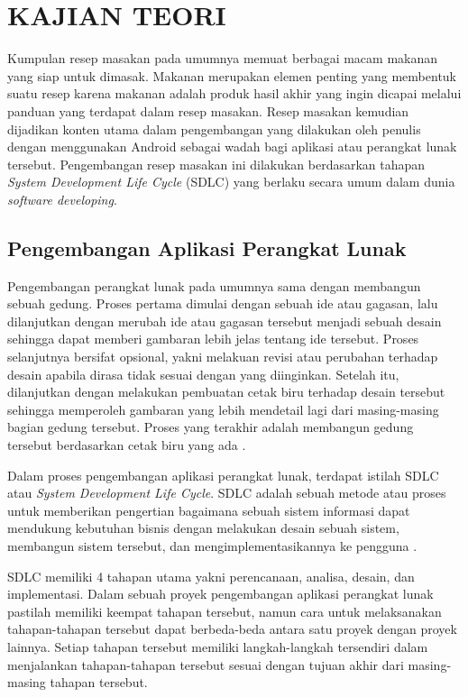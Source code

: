 
\chapter{KAJIAN TEORI}                

Kumpulan resep masakan pada umumnya memuat berbagai macam makanan yang siap untuk dimasak. Makanan merupakan elemen penting yang membentuk suatu resep karena makanan adalah produk hasil akhir yang ingin dicapai melalui panduan yang terdapat dalam resep masakan. Resep masakan kemudian dijadikan konten utama dalam pengembangan yang dilakukan oleh penulis dengan menggunakan Android sebagai wadah bagi aplikasi atau perangkat lunak tersebut. Pengembangan resep masakan ini dilakukan berdasarkan tahapan \emph{System Development Life Cycle} (SDLC) yang berlaku secara umum dalam dunia \emph{software developing}.


\section{Pengembangan Aplikasi Perangkat Lunak}
	Pengembangan perangkat lunak pada umumnya sama dengan membangun sebuah gedung. Proses pertama dimulai dengan sebuah ide atau gagasan, lalu dilanjutkan dengan merubah ide atau gagasan tersebut menjadi sebuah desain sehingga dapat memberi gambaran lebih jelas tentang ide tersebut. Proses selanjutnya bersifat opsional, yakni melakuan revisi atau perubahan terhadap desain apabila dirasa tidak sesuai dengan yang diinginkan. Setelah itu, dilanjutkan dengan melakukan pembuatan cetak biru terhadap desain tersebut sehingga memperoleh gambaran yang lebih mendetail lagi dari masing-masing bagian gedung tersebut. Proses yang terakhir adalah membangun gedung tersebut berdasarkan cetak biru yang ada \cite{francis}. 
	
	Dalam proses pengembangan aplikasi perangkat lunak, terdapat istilah SDLC atau \emph{System Development Life Cycle}. SDLC adalah sebuah metode atau proses untuk memberikan pengertian bagaimana sebuah sistem informasi dapat mendukung kebutuhan bisnis dengan melakukan desain sebuah sistem, membangun sistem tersebut, dan mengimplementasikannya ke pengguna \cite{denis}.
	
	SDLC memiliki 4 tahapan utama yakni perencanaan, analisa, desain, dan implementasi. Dalam sebuah proyek pengembangan aplikasi perangkat lunak pastilah memiliki keempat tahapan tersebut, namun cara untuk melaksanakan tahapan-tahapan tersebut dapat berbeda-beda antara satu proyek dengan proyek lainnya. Setiap tahapan tersebut memiliki langkah-langkah tersendiri dalam menjalankan tahapan-tahapan tersebut sesuai dengan tujuan akhir dari masing-masing tahapan tersebut.
	
